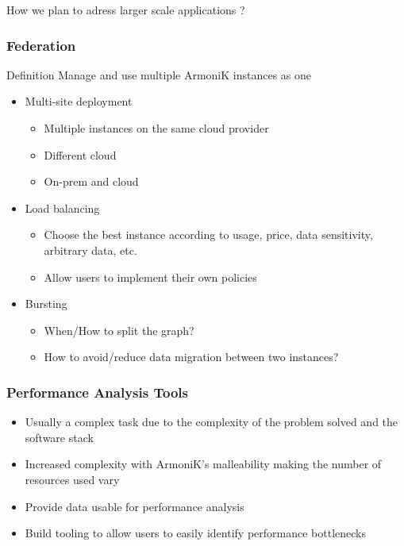 \documentclass[10pt,aspectratio=1609]{beamer}
\begin{document}
\begin{section}{How we plan to adress larger scale applications ?}
  \begin{frame}
    \frametitle{Federation}
    \begin{block}{Definition}
      Manage and use multiple ArmoniK instances as one
    \end{block}
    \begin{itemize}
      \item Multi-site deployment
      \begin{itemize}
        \item Multiple instances on the same cloud provider
        \item Different cloud
        \item On-prem and cloud
      \end{itemize}
      \item Load balancing
      \begin{itemize}
        \item Choose the best instance according to usage, price, data sensitivity, arbitrary data, etc.
        \item Allow users to implement their own policies
      \end{itemize}
      \item Bursting
      \begin{itemize}
        \item When/How to split the graph?
        \item How to avoid/reduce data migration between two instances?
      \end{itemize}
    \end{itemize}
  \end{frame}

  \begin{frame}
    \frametitle{Performance Analysis Tools}
    \begin{itemize}
      \item Usually a complex task due to the complexity of the problem solved and the software stack
      \item Increased complexity with ArmoniK's malleability making the number of resources used vary
      \item Provide data usable for performance analysis
      \item Build tooling to allow users to easily identify performance bottlenecks
    \end{itemize}
  \end{frame}


\end{section}
\end{document}

